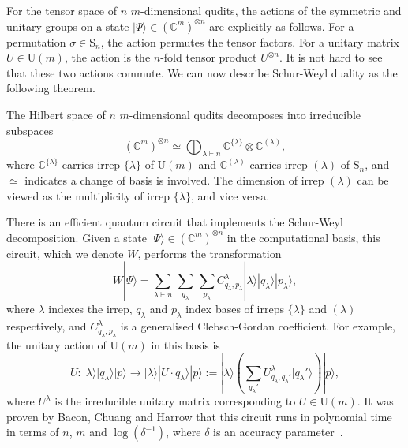 For the tensor space of $n$ $m$-dimensional qudits, the actions of the symmetric and unitary groups on a state $|\Psi\rangle \in (\mathbb{C}^m)^{\otimes n}$ are explicitly as follows. 
For a permutation $\sigma \in \textrm{S}_n$, the action permutes the tensor factors. 
For a unitary matrix $U \in \textrm{U}(m)$, the action is the $n$-fold tensor product $U^{\otimes n}$. 
It is not hard to see that these two actions commute.
We can now describe Schur-Weyl duality as the following theorem.
\begin{theorem}
The Hilbert space of $n$ $m$-dimensional qudits decomposes into irreducible subspaces
\begin{equation}
(\mathbb{C}^m)^{\otimes n} \simeq \bigoplus_{\lambda\vdash n} \mathbb{C}^{\{\lambda\}} \otimes \mathbb{C}^{(\lambda)} ,
\end{equation}
where $\mathbb{C}^{\{\lambda\}}$ carries irrep $\{\lambda\}$ of $\textrm{U}(m)$ and $\mathbb{C}^{(\lambda)}$ carries irrep $(\lambda)$ of $\textrm{S}_n$, and $\simeq$ indicates a change of basis is involved.
The dimension of irrep $(\lambda)$ can be viewed as the multiplicity of irrep $\{\lambda\}$, and vice versa.
\end{theorem}

There is an efficient quantum circuit that implements the Schur-Weyl decomposition.
Given a state $|\Psi\rangle \in (\mathbb{C}^m)^{\otimes n}$ in the computational basis, this circuit, which we denote $W$, performs the transformation
\begin{equation}
W|\Psi\rangle
 = \sum_{\lambda \vdash n} \, \sum_{q_{\lambda}} \, \sum_{p_\lambda}C^\lambda_{q_\lambda,p_\lambda}|\lambda\rangle|q_\lambda\rangle|p_\lambda\rangle , 
\end{equation}
where $\lambda$ indexes the irrep, $q_\lambda$ and $p_\lambda$ index bases of irreps $\{\lambda\}$ and $(\lambda)$ respectively, and $C^\lambda_{q_\lambda,p_\lambda}$ is a generalised Clebsch-Gordan coefficient.
For example, the unitary action of U$(m)$ in this basis is
\begin{equation}
U : |\lambda\rangle |q_\lambda\rangle |p\rangle \rightarrow |\lambda\rangle |U\cdot q_\lambda\rangle |p\rangle := |\lambda\rangle \left( \sum_{q_\lambda'} U^\lambda_{q_\lambda, q_\lambda'} |q_\lambda'\rangle \right) |p\rangle ,
\end{equation}
where $U^\lambda$ is the irreducible unitary matrix corresponding to $U \in \mathrm{U}(m)$.
It was proven by Bacon, Chuang and Harrow that this circuit runs in polynomial time in terms of $n$, $m$ and $\log(\delta^{-1})$, where $\delta$ is an accuracy parameter~\cite{bacon2007}.



